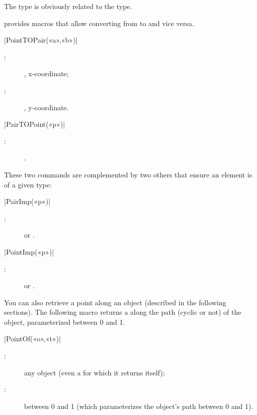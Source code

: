 \documentclass[a4paper,english]{article}
\begin{document}
The  type is obviously related to the \MP{}  type.

\mpgeomdd provides macros that allow converting from  to
 and vice versa.
\begin{colourband}
\macro|PointTOPair(«a»,«b»)|
\begin{description}
  \item[:] , x-coordinate;
  \item[:] , y-coordinate.
\end{description}
\end{colourband}

\begin{colourband}
\macro|PairTOPoint(«p»)|
\begin{description}
  \item[:] .
\end{description}
\end{colourband}

These two commands are complemented by two others that ensure an element is of a given type:
\begin{colourband}
\macro|PairImp(«p»)|
\begin{description}
  \item[:]  or .
\end{description}
\end{colourband}


\begin{colourband}
\macro|PointImp(«p»)|
\begin{description}
  \item[:]  or .
\end{description}
\end{colourband}

You can also retrieve a point along an \mpgeomdd object (described in the following sections). The following macro returns a  along the path (cyclic or not) of the object, parameterized between 0 and 1.

\begin{colourband}
\macro|PointOf(«o»,«t»)|
\begin{description}
  \item[:] any \mpgeomdd object (even a  for which it returns itself);
  \item[:]  between 0 and 1 (which parameterizes the object's path between 0 and 1).
\end{description}
\end{colourband}
\end{document}
